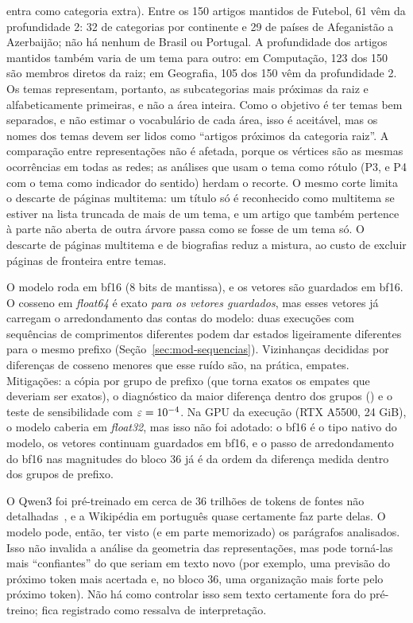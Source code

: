 \begin{description}
    entra como categoria extra). Entre os 150 artigos mantidos de
    Futebol, 61 vêm da profundidade 2: 32 de categorias por continente e 29 de países de
    Afeganistão a Azerbaijão; não há nenhum de Brasil ou Portugal. A profundidade dos artigos
    mantidos também varia de um tema para outro: em Computação, 123 dos 150 são membros diretos
    da raiz; em Geografia, 105 dos 150 vêm da profundidade 2. Os temas representam, portanto,
    as subcategorias mais próximas da raiz e alfabeticamente primeiras, e não a área inteira.
    Como o objetivo é ter temas bem separados, e não estimar o vocabulário de cada área, isso é
    aceitável, mas os nomes dos temas devem ser lidos como ``artigos próximos da categoria
    raiz''. A comparação entre representações não é afetada, porque os vértices são as mesmas
    ocorrências em todas as redes; as análises que usam o tema como rótulo (P3, e P4 com o tema
    como indicador do sentido) herdam o recorte. O mesmo corte limita o
    descarte de páginas multitema: um título só é reconhecido como multitema se estiver na
    lista truncada de mais de um tema, e um artigo que também pertence à parte não aberta de
    outra árvore passa como se fosse de um tema só. O descarte de páginas multitema e de
    biografias reduz a mistura, ao custo de excluir páginas de fronteira entre temas.

    \item[Precisão \emph{bfloat16}.] O modelo roda em bf16 (8 bits de mantissa), e os vetores
    são guardados em bf16. O cosseno em \emph{float64} é exato \emph{para os vetores
    guardados}, mas esses vetores já carregam o arredondamento das contas do modelo: duas
    execuções com sequências de comprimentos diferentes podem dar estados ligeiramente
    diferentes para o mesmo prefixo (Seção~\ref{sec:mod-sequencias}). Vizinhanças decididas por
    diferenças de cosseno menores que esse ruído são, na prática, empates. Mitigações: a cópia
    por grupo de prefixo (que torna exatos os empates que deveriam ser exatos), o diagnóstico da
    maior diferença dentro dos grupos (\difMaxPrefixo) e o teste de sensibilidade com
    $\varepsilon=10^{-4}$. Na GPU da execução (RTX A5500, 24 GiB), o modelo caberia em
    \emph{float32}, mas isso não foi adotado: o bf16 é o tipo nativo do modelo, os vetores
    continuam guardados em bf16, e o passo de arredondamento do bf16 nas magnitudes do bloco 36
    já é da ordem da diferença medida dentro dos grupos de prefixo.

    \item[A Wikipédia provavelmente está no pré-treino.] O Qwen3 foi pré-treinado em cerca de 36
    trilhões de tokens de fontes não detalhadas~\cite{qwen3}, e a Wikipédia em português quase
    certamente faz parte delas. O modelo pode, então, ter visto (e em parte memorizado) os
    parágrafos analisados. Isso não invalida a análise da geometria das representações, mas
    pode torná-las mais ``confiantes'' do que seriam em texto novo (por exemplo, uma previsão
    do próximo token mais acertada e, no bloco 36, uma organização mais forte pelo próximo
    token). Não há como controlar isso sem texto certamente fora do pré-treino; fica registrado
    como ressalva de interpretação.


\end{description}
